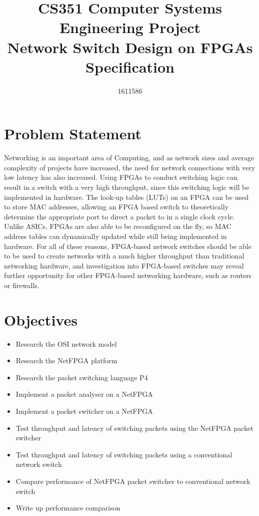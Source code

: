 \documentclass[12pt, a4paper, twoside]{IEEEtran}
\title{CS351 Computer Systems Engineering Project \\ Network Switch Design on FPGAs \\ \Large{Specification}}
\author{1611586}
\begin{document}
\maketitle

\section{Problem Statement}
\label{problem_statement}
Networking is an important area of Computing, and as network sizes and average complexity of projects have increased,
the need for network connections with very low latency has also increased.
Using FPGAs to conduct switching logic can result in a switch with a very high throughput, since this switching logic will be implemented in hardware. The look-up tables (LUTs) on an FPGA can be used to store MAC addresses, allowing an FPGA based switch to theoretically determine the appropriate port to direct a packet to in a single clock cycle. Unlike ASICs, FPGAs are also able to be reconfigured on the fly, so MAC address tables can dynamically updated while still being implemented in hardware.
For all of these reasons, FPGA-based network switches should be able to be used to create networks with a much higher throughput than traditional networking hardware, and investigation into FPGA-based switches may reveal further opportunity for other FPGA-based networking hardware, such as routers or firewalls.

\section{Objectives}
\label{objectives}
\begin{itemize}
  \item Research the OSI network model
  \item Research the NetFPGA platform \cite{NetFPGA}
  \item Research the packet switching language P4 \cite{P4}
  \item Implement a packet analyser on a NetFPGA
  \item Implement a packet switcher on a NetFPGA
  \item Test throughput and latency of switching packets using the NetFPGA packet switcher
  \item Test throughput and latency of switching packets using a conventional network switch
  \item Compare performance of NetFPGA packet switcher to conventional network switch
  \item Write up performance comparison
\end{itemize}
\end{document}
